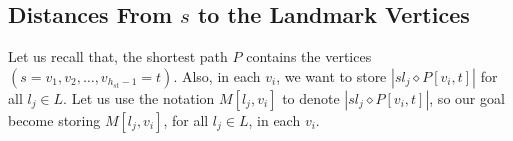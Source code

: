 








\subsection{Distances From \texorpdfstring{$s$}{s} to the Landmark Vertices}
\label{s to land}

Let us recall that, the shortest path $P$ contains the vertices $(s=v_1, v_2, \dots, v_{h_{st}-1}=t)$. Also, in each $v_i$, we want to store $|sl_j \diamond P[v_{i},t]|$ for all $l_j \in L$. Let us use the notation $M[l_j, v_i]$ to denote $|sl_j \diamond P[v_{i},t]|$, so our goal become storing $M[l_j,v_i]$, for all $l_j \in L$, in each $v_i$. 

